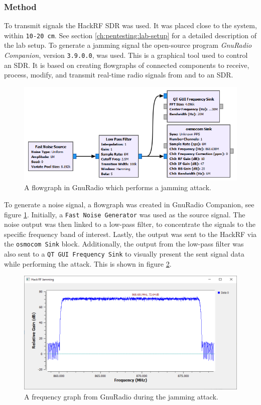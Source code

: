 \subsubsection{Method}
To transmit signals the HackRF SDR was used. It was placed close to the system, within \texttt{10-20 cm}. See section \ref{ch:pentesting:lab-setup} for a detailed description of the lab setup. To generate a jamming signal the open-source program \textit{GnuRadio Companion}, version \texttt{3.9.0.0}, was used. This is a graphical tool used to control an SDR. It is based on creating flowgraphs of connected components to receive, process, modify, and transmit real-time radio signals from and to an SDR.
\begin{figure}[!ht]
    \centering
    \includegraphics[width=\textwidth]{images/6-pentesting/jamming-flowgraph.png}
    \caption{A flowgraph in GnuRadio which performs a jamming attack.}
    \label{fig:gnuradio-jamming-flowgraph}
\end{figure}

To generate a noise signal, a flowgraph was created in GnuRadio Companion, see figure \ref{fig:gnuradio-jamming-flowgraph}. Initially, a \texttt{Fast Noise Generator} was used as the source signal. The noise output was then linked to a low-pass filter, to concentrate the signals to the specific frequency band of interest. Lastly, the output was sent to the HackRF via the \texttt{osmocom Sink} block. Additionally, the output from the low-pass filter was also sent to a \texttt{QT GUI Frequency Sink} to visually present the sent signal data while performing the attack. This is shown in figure \ref{fig:gnuradio-frequency-graph}.
\begin{figure}[!ht]
    \centering
    \includegraphics[width=\textwidth]{images/6-pentesting/jamming-output-graph.png}
    \caption{A frequency graph from GnuRadio during the jamming attack.}
    \label{fig:gnuradio-frequency-graph}
\end{figure}

